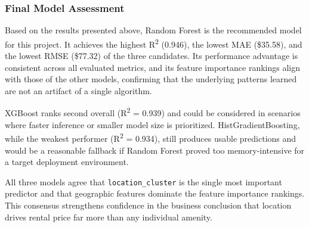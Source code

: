 \subsubsection{Final Model Assessment}
\noindent
Based on the results presented above, Random Forest is the recommended model for this project. It achieves the highest R\textsuperscript{2} (0.946), the lowest MAE (\$35.58), and the lowest RMSE (\$77.32) of the three candidates. Its performance advantage is consistent across all evaluated metrics, and its feature importance rankings align with those of the other models, confirming that the underlying patterns learned are not an artifact of a single algorithm.

\noindent
XGBoost ranks second overall (R\textsuperscript{2} = 0.939) and could be considered in scenarios where faster inference or smaller model size is prioritized. HistGradientBoosting, while the weakest performer (R\textsuperscript{2} = 0.934), still produces usable predictions and would be a reasonable fallback if Random Forest proved too memory-intensive for a target deployment environment.

\noindent
All three models agree that \texttt{location\_cluster} is the single most important predictor and that geographic features dominate the feature importance rankings. This consensus strengthens confidence in the business conclusion that location drives rental price far more than any individual amenity.

